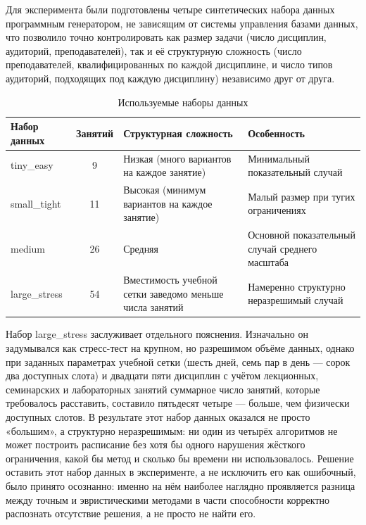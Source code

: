 Для эксперимента были подготовлены четыре синтетических набора данных программным генератором, не зависящим от системы управления базами данных, что позволило точно контролировать как размер задачи (число дисциплин, аудиторий, преподавателей), так и её структурную сложность (число преподавателей, квалифицированных по каждой дисциплине, и число типов аудиторий, подходящих под каждую дисциплину) независимо друг от друга.
\begin{table}[h]
    \centering
    \caption{Используемые наборы данных}
    \label{tab:datasets}

    \begin{tabular}{|l|c|p{4cm}|p{5cm}|}
        \hline
        \textbf{Набор данных} &
        \textbf{Занятий} &
        \textbf{Структурная сложность} &
        \textbf{Особенность} \\
        \hline

        tiny\_easy &
        9 &
        Низкая (много вариантов на каждое занятие) &
        Минимальный показательный случай \\
        \hline

        small\_tight &
        11 &
        Высокая (минимум вариантов на каждое занятие) &
        Малый размер при тугих ограничениях \\
        \hline

        medium &
        26 &
        Средняя &
        Основной показательный случай среднего масштаба \\
        \hline

        large\_stress &
        54 &
        Вместимость учебной сетки заведомо меньше числа занятий &
        Намеренно структурно неразрешимый случай \\
        \hline

    \end{tabular}
\end{table}

Набор large_stress заслуживает отдельного пояснения. Изначально он задумывался как стресс-тест на крупном, но разрешимом объёме данных, однако при заданных параметрах учебной сетки (шесть дней, семь пар в день — сорок два доступных слота) и двадцати пяти дисциплин с учётом лекционных, семинарских и лабораторных занятий суммарное число занятий, которые требовалось расставить, составило пятьдесят четыре — больше, чем физически доступных слотов. В результате этот набор данных оказался не просто «большим», а структурно неразрешимым: ни один из четырёх алгоритмов не может построить расписание без хотя бы одного нарушения жёсткого ограничения, какой бы метод и сколько бы времени ни использовалось. Решение оставить этот набор данных в эксперименте, а не исключить его как ошибочный, было принято осознанно: именно на нём наиболее наглядно проявляется разница между точным и эвристическими методами в части способности корректно распознать отсутствие решения, а не просто не найти его.

